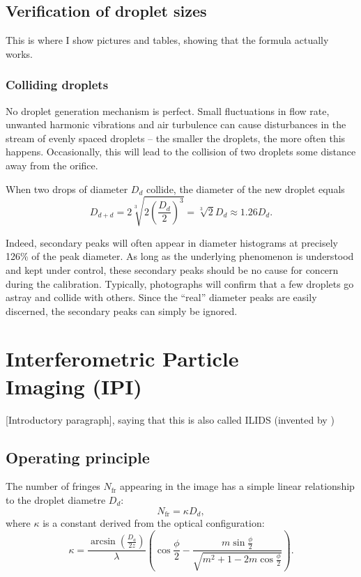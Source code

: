 \documentclass[10pt]{book}
\begin{document}
\section{Verification of droplet sizes}
This is where I show pictures and tables, showing that the formula
actually works.

\subsection{Colliding droplets}
\label{sec:droplet-collisions}
No droplet generation mechanism is perfect. Small fluctuations in flow rate,
unwanted harmonic vibrations and air turbulence can cause disturbances in the
stream of evenly spaced droplets -- the smaller the droplets, the more often
this happens. Occasionally, this will lead to the collision
of two droplets some distance away from the orifice.

When two drops of diameter $D_d$ collide, the diameter of the new droplet equals
\begin{equation}
    D_{d+d} = 2\sqrt[3]{2\left(\frac{D_d}{2}\right)^3} = \sqrt[3]{2} D_d \approx
    1.26 D_d.
\end{equation}

Indeed, secondary peaks will often appear in diameter histograms at precisely 126\% of
the peak diameter. As long as the underlying phenomenon is understood and kept
under control, these secondary peaks should be no cause for concern during the
calibration. Typically, photographs will confirm that a few droplets go astray
and collide with others. Since the ``real'' diameter peaks are easily discerned,
the secondary peaks can simply be ignored.

    \chapter[Interferometric Particle Imaging (IPI)]{Interferometric Particle\\ Imaging (IPI)}
    [Introductory paragraph], saying that this is also called ILIDS (invented by
    \citet{Glover95})
\section{Operating principle}
The number of fringes $N_\text{fr}$ appearing in the image has a simple linear relationship to
the droplet diametre $D_d$:
\begin{equation}
    N_\text{fr} = \kappa D_d,
\end{equation}
where $\kappa$ is a constant derived from the optical configuration:
\begin{equation}
    \kappa = \frac{\arcsin\left(\frac{D_a}{2z}\right)}{\lambda}
    \left(\cos\frac{\phi}{2} - \frac{m \sin\frac{\phi}{2}}{\sqrt{m^2 + 1 -
    2m\cos \frac{\phi}{2}}}\right).
    \label{kappa}
\end{equation}
\end{document}
